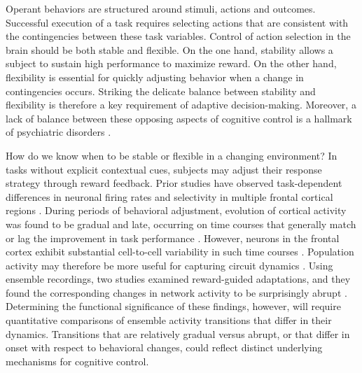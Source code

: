 
Operant behaviors are structured around stimuli, actions and outcomes. Successful execution of a task requires selecting actions that are consistent with the contingencies between these task variables. Control of action selection in the brain should be both stable and flexible. On the one hand, stability allows a subject to sustain high performance to maximize reward. On the other hand, flexibility is essential for quickly adjusting behavior when a change in contingencies occurs. Striking the delicate balance between stability and flexibility is therefore a key requirement of adaptive decision-making. Moreover, a lack of balance between these opposing aspects of cognitive control is a hallmark of psychiatric disorders \citep{griffiths2014translational}.

How do we know when to be stable or flexible in a changing environment? In tasks without explicit contextual cues, subjects may adjust their response strategy through reward feedback. Prior studies have observed task-dependent differences in neuronal firing rates and selectivity in multiple frontal cortical regions \citep{asaad2000task,rich2009rat,rodgers2014neural}. During periods of behavioral adjustment, evolution of cortical activity was found to be gradual and late, occurring on time courses that generally match or lag the improvement in task performance \citep{mitz1991learning,chen1995neuronal,pasupathy2005different,antzoulatos2011differences}. However, neurons in the frontal cortex exhibit substantial cell-to-cell variability in such time courses \citep{mitz1991learning}. Population activity may therefore be more useful for capturing circuit dynamics \citep{mante2013context,stokes2013dynamic,wills2005attractor}. Using ensemble recordings, two studies examined reward-guided adaptations, and they found the corresponding changes in network activity to be surprisingly abrupt \citep{durstewitz2010abrupt,karlsson2012network}. Determining the functional significance of these findings, however, will require quantitative comparisons of ensemble activity transitions that differ in their dynamics. Transitions that are relatively gradual versus abrupt, or that differ in onset with respect to behavioral changes, could reflect distinct underlying mechanisms for cognitive control.

